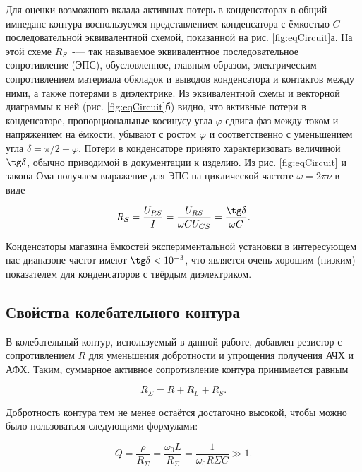 \documentclass[a4paper,12pt]{article} %
\begin{document}
Для оценки возможного вклада активных потерь в конденсаторах в общий импеданс контура воспользуемся представлением конденсатора с ёмкостью $C$ последовательной эквивалентной схемой, показанной на рис. \ref{fig:eqCircuit}а. На этой схеме $R_S$~-— так называемое эквивалентное последовательное сопротивление (ЭПС), обусловленное, главным образом, электрическим сопротивлением материала обкладок и выводов конденсатора и контактов между ними, а также потерями в диэлектрике. Из эквивалентной схемы и векторной диаграммы к ней (рис. \ref{fig:eqCircuit}б) видно, что активные потери в конденсаторе, пропорциональные косинусу угла $\varphi$ сдвига фаз между током и напряжением на ёмкости, убывают с ростом $\varphi$ и соответственно с уменьшением угла $\delta = \pi/2 - \varphi$. Потери в конденсаторе принято характеризовать величиной $\tg \delta$, обычно приводимой в документации к изделию. Из рис. \ref{fig:eqCircuit} и закона Ома получаем выражение для ЭПС на циклической частоте $\omega = 2\pi\nu$ в виде

\begin{equation} \label{eq:EPS}
    R_S = \frac{U_{RS}}{I} = \frac{U_{RS}}{\omega CU_{CS}} = \frac{\tg \delta}{\omega C}. 
\end{equation}

Конденсаторы магазина ёмкостей экспериментальной установки в интересующем нас диапазоне частот имеют $\tg \delta < 10^{-3}$, что является очень хорошим (низким) показателем для конденсаторов с твёрдым диэлектриком.

\subsection{Свойства колебательного контура}

В колебательный контур, используемый в данной работе, добавлен резистор с сопротивлением $R$ для уменьшения добротности и упрощения получения АЧХ и АФХ. Таким, суммарное активное сопротивление контура принимается равным

\begin{equation}
    R_\Sigma = R + R_L + R_S.
\end{equation}

Добротность контура тем не менее остаётся достаточно высокой, чтобы можно было пользоваться следующими формулами:

\begin{equation} \label{eq:Q}
    Q = \frac{\rho}{R_\Sigma} = \frac{\omega_0L}{R_\Sigma} = \frac{1}{\omega_0 R\Sigma C} \gg 1.
\end{equation}
\end{document}
